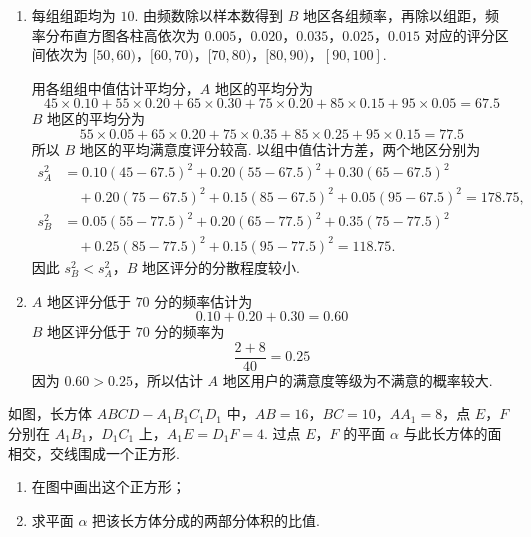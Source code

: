\begin{solution}
\begin{enumerate}
\item 每组组距均为 \(10\). 由频数除以样本数得到 \(B\) 地区各组频率，再除以组距，频率分布直方图各柱高依次为
\(0.005\)，\(0.020\)，\(0.035\)，\(0.025\)，\(0.015\)
对应的评分区间依次为 \([50,60)\)，\([60,70)\)，\([70,80)\)，\([80,90)\)，\([90,100]\).

用各组组中值估计平均分，\(A\) 地区的平均分为
\[
45\times0.10+55\times0.20+65\times0.30+75\times0.20+85\times0.15+95\times0.05=67.5
\]
\(B\) 地区的平均分为
\[
55\times0.05+65\times0.20+75\times0.35+85\times0.25+95\times0.15=77.5
\]
所以 \(B\) 地区的平均满意度评分较高. 以组中值估计方差，两个地区分别为
\[
\begin{aligned}
s_A^2&=0.10(45-67.5)^2+0.20(55-67.5)^2+0.30(65-67.5)^2\\
&\quad+0.20(75-67.5)^2+0.15(85-67.5)^2+0.05(95-67.5)^2=178.75,\\
s_B^2&=0.05(55-77.5)^2+0.20(65-77.5)^2+0.35(75-77.5)^2\\
&\quad+0.25(85-77.5)^2+0.15(95-77.5)^2=118.75.
\end{aligned}
\]
因此 \(s_B^2<s_A^2\)，\(B\) 地区评分的分散程度较小.

\item \(A\) 地区评分低于 \(70\) 分的频率估计为
\[
0.10+0.20+0.30=0.60
\]
\(B\) 地区评分低于 \(70\) 分的频率为
\[
\frac{2+8}{40}=0.25
\]
因为 \(0.60>0.25\)，所以估计 \(A\) 地区用户的满意度等级为不满意的概率较大.
\end{enumerate}
\end{solution}

\begin{problem}
如图，长方体 \(ABCD - A_{1}B_{1}C_{1}D_{1}\) 中，\(AB = 16\)，\(BC = 10\)，\(AA_{1} = 8\)，点 \(E\)，\(F\) 分别在 \(A_{1}B_{1}\)，\(D_{1}C_{1}\) 上，\(A_{1}E = D_{1}F = 4\). 过点 \(E\)，\(F\) 的平面 \(\alpha\) 与此长方体的面相交，交线围成一个正方形.

\begin{enumerate}
\item 在图中画出这个正方形；
\item 求平面 \(\alpha\) 把该长方体分成的两部分体积的比值.
\end{enumerate}

\end{problem}

